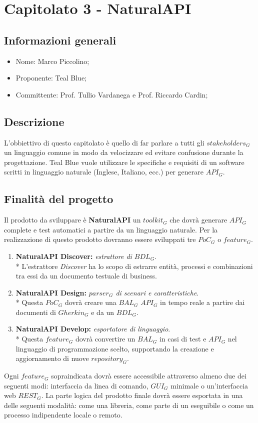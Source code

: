 \section{Capitolato 3 - NaturalAPI}
\subsection{Informazioni generali}
\begin{itemize}
	\item Nome: Marco Piccolino;
	\item Proponente: Teal Blue;
	\item Committente: Prof. Tullio Vardanega e Prof. Riccardo Cardin;
\end{itemize}
\subsection{Descrizione}
L'obbiettivo di questo capitolato è quello di far parlare a tutti gli $stakeholders_G$ un linguaggio comune in modo da velocizzare ed evitare confusione durante la progettazione. Teal Blue vuole utilizzare le specifiche e requisiti di un software scritti in linguaggio naturale (Inglese, Italiano, ecc.) per generare $API_G$.
\subsection{Finalità del progetto}
Il prodotto da sviluppare è \textbf{NaturalAPI} un $toolkit_G$ che dovrà generare $API_G$ complete e test automatici a partire da un linguaggio naturale. Per la realizzazione di questo prodotto dovranno essere sviluppati tre $PoC_G$ o $feature_G$.
\begin{enumerate}
	\item \textbf{NaturalAPI Discover: }\textit{estrattore di $BDL_G$}. \\*
	L'estrattore \textit{Discover} ha lo scopo di estrarre entità, processi e combinazioni tra essi da un documento testuale di business.
	\item \textbf{NaturalAPI Design: }\textit{$parser_G$ di scenari e caratteristiche}. \\*
	Questa $PoC_G$ dovrà creare una $BAL_G$ $API_G$ in tempo reale a partire dai documenti di $Gherkin_G$ e da un $BDL_G$.
	\item \textbf{NaturalAPI Develop: }\textit{esportatore di linguaggio}. \\* 
	Questa $feature_G$ dovrà convertire un $BAL_G$ in casi di test e $API_G$ nel linguaggio di programmazione scelto, supportando la creazione e aggiornamento di nuove $repository_G$.
\end{enumerate} 
Ogni $feature_G$ sopraindicata dovrà essere accessibile attraverso almeno due dei seguenti modi: interfaccia da linea di comando, $GUI_G$ minimale o un'interfaccia web $REST_G$.
La parte logica del prodotto finale dovrà essere esportata in una delle seguenti modalità: come una libreria, come parte di un eseguibile o come un processo indipendente locale o remoto.  


